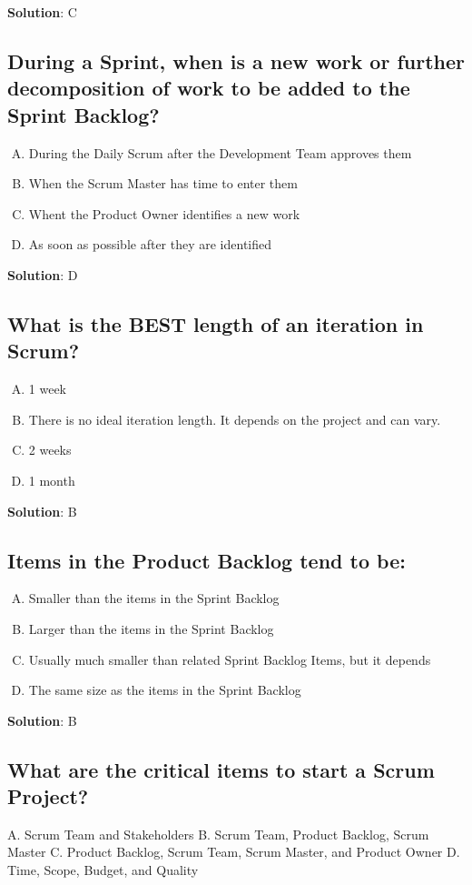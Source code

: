 \textbf{Solution}: C


\subsection{During a Sprint, when is a new work or further decomposition of work to be added to the Sprint Backlog?}
\begin{enumerate}[A)]
  \item During the Daily Scrum after the Development Team approves them
  \item When the Scrum Master has time to enter them
  \item Whent the Product Owner identifies a new work
  \item As soon as possible after they are identified
\end{enumerate}


\textbf{Solution}: D


\subsection{What is the BEST length of an iteration in Scrum?}
\begin{enumerate}[A)]
  \item 1 week
  \item There is no ideal iteration length. It depends on the project and can vary.
  \item 2 weeks
  \item 1 month
\end{enumerate}


\textbf{Solution}: B


\subsection{Items in the Product Backlog tend to be:}
\begin{enumerate}[A)]
  \item Smaller than the items in the Sprint Backlog
  \item Larger than the items in the Sprint Backlog
  \item Usually much smaller than related Sprint Backlog Items, but it depends
  \item The same size as the items in the Sprint Backlog
\end{enumerate}


\textbf{Solution}: B


\subsection{What are the critical items to start a Scrum Project?}
A. Scrum Team and Stakeholders
B. Scrum Team, Product Backlog, Scrum Master
C. Product Backlog, Scrum Team, Scrum Master, and Product Owner
D. Time, Scope, Budget, and Quality

